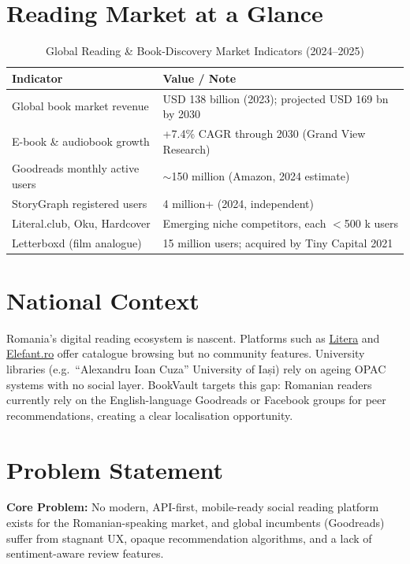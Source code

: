 \documentclass[12pt, a4paper]{report}
\begin{document}
\section{Reading Market at a Glance}

\begin{table}[H]
  \centering
  \caption{Global Reading \& Book-Discovery Market Indicators (2024--2025)}
  \begin{tabularx}{\textwidth}{L{5cm} X}
    \toprule
    \textbf{Indicator} & \textbf{Value / Note} \\
    \midrule
    Global book market revenue    & USD 138 billion (2023); projected USD 169 bn by 2030 \\
    E-book \& audiobook growth    & +7.4\% CAGR through 2030 (Grand View Research) \\
    Goodreads monthly active users & $\sim$150 million (Amazon, 2024 estimate) \\
    StoryGraph registered users    & 4 million+ (2024, independent) \\
    Literal.club, Oku, Hardcover   & Emerging niche competitors, each $<$500 k users \\
    Letterboxd (film analogue)     & 15 million users; acquired by Tiny Capital 2021 \\
    \bottomrule
  \end{tabularx}
\end{table}

\section{National Context}

Romania's digital reading ecosystem is nascent.  Platforms such as \href{https://www.litera.ro}{Litera}
and \href{https://elefant.ro}{Elefant.ro} offer catalogue browsing but no community features.
University libraries (e.g.\ ``Alexandru Ioan Cuza'' University of Iași) rely on ageing OPAC
systems with no social layer.  BookVault targets this gap: Romanian readers currently rely on
the English-language Goodreads or Facebook groups for peer recommendations, creating a clear
localisation opportunity.

\section{Problem Statement}

\begin{infobox}
  \textbf{Core Problem:} No modern, API-first, mobile-ready social reading platform exists for
  the Romanian-speaking market, and global incumbents (Goodreads) suffer from stagnant UX,
  opaque recommendation algorithms, and a lack of sentiment-aware review features.
\end{infobox}
\end{document}

